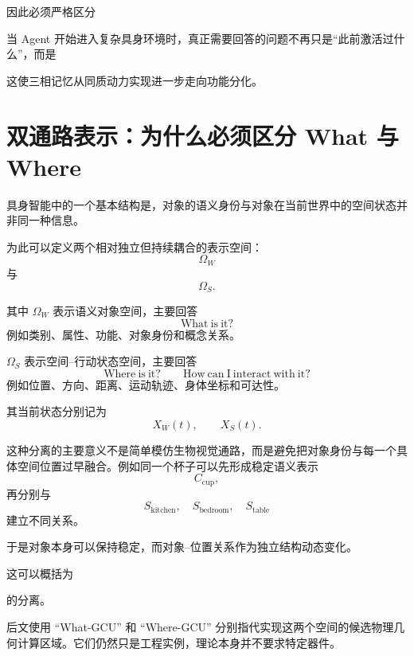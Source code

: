 因此必须严格区分
\begin{statementbox}
\centering
{}
\end{statementbox}

当 Agent 开始进入复杂具身环境时，真正需要回答的问题不再只是“此前激活过什么”，而是
\begin{statementbox}
\centering
{}
\end{statementbox}

这使三相记忆从同质动力实现进一步走向功能分化。

\section{双通路表示：为什么必须区分 What 与 Where}

具身智能中的一个基本结构是，对象的语义身份与对象在当前世界中的空间状态并非同一种信息。

为此可以定义两个相对独立但持续耦合的表示空间：
\[
\Omega_W
\]
与
\[
\Omega_S.
\]

其中 $\Omega_W$ 表示语义对象空间，主要回答
\[
\mathrm{What\ is\ it?}
\]
例如类别、属性、功能、对象身份和概念关系。

$\Omega_S$ 表示空间--行动状态空间，主要回答
\[
\mathrm{Where\ is\ it?}
\qquad
\mathrm{How\ can\ I\ interact\ with\ it?}
\]
例如位置、方向、距离、运动轨迹、身体坐标和可达性。

其当前状态分别记为
\[
X_W(t),
\qquad
X_S(t).
\]

这种分离的主要意义不是简单模仿生物视觉通路，而是避免把对象身份与每一个具体空间位置过早融合。例如同一个杯子可以先形成稳定语义表示
\[
C_{\mathrm{cup}},
\]
再分别与
\[
S_{\mathrm{kitchen}},
\quad
S_{\mathrm{bedroom}},
\quad
S_{\mathrm{table}}
\]
建立不同关系。

于是对象本身可以保持稳定，而对象--位置关系作为独立结构动态变化。

这可以概括为
\begin{statementbox}
\centering
{}
\end{statementbox}
的分离。

后文使用 ``What-GCU'' 和 ``Where-GCU'' 分别指代实现这两个空间的候选物理几何计算区域。它们仍然只是工程实例，理论本身并不要求特定器件。

